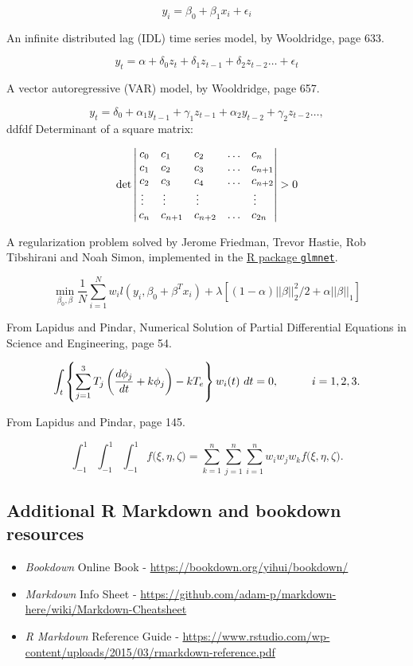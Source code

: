 \documentclass[12pt,oneside]{chicagocapstone}
\begin{document}
\[y_i = \beta_0 + \beta_1 x_i + \epsilon_i\]

An infinite distributed lag (IDL) time series model, by Wooldridge, page
633.

\[ y_t = \alpha + \delta_0 z_t + \delta_1 z_{t-1} + \delta_2 z_{t-2} \ldots + \epsilon_t\]

A vector autoregressive (VAR) model, by Wooldridge, page 657.

\[ y_t = \delta_0 + \alpha_1 y_{t-1} + \gamma_1 z_{t-1} + \alpha_2 y_{t-2} + \gamma_2 z_{t-2} \ldots,\]
\newpage
ddfdf Determinant of a square matrix:

\[\det\left|\,\begin{matrix}%
c_0&c_1\hfill&c_2\hfill&\ldots&c_n\hfill\cr
c_1&c_2\hfill&c_3\hfill&\ldots&c_{n+1}\hfill\cr
c_2&c_3\hfill&c_4\hfill&\ldots&c_{n+2}\hfill\cr
\,\vdots\hfill&\,\vdots\hfill&
  \,\vdots\hfill&&\,\vdots\hfill\cr
c_n&c_{n+1}\hfill&c_{n+2}\hfill&\ldots&c_{2n}\hfill\cr
\end{matrix}\right|>0\]
\bigskip

A regularization problem solved by Jerome Friedman, Trevor Hastie, Rob
Tibshirani and Noah Simon, implemented in the
\href{https://cran.r-project.org/web/packages/glmnet/index.html}{R
package \texttt{glmnet}}.

\[ \min_{\beta_0,\beta} \frac{1}{N}\sum_{i=1}^N w_il(y_i,\beta_0+\beta^Tx_i)+\lambda \left[(1-\alpha) ||\beta||_2^2/2+\alpha||\beta||_1\right]\]

\bigskip

From Lapidus and Pindar, Numerical Solution of Partial Differential
Equations in Science and Engineering, page 54.

\[\int_t\left\{\sum_{j=1}^3 T_j \left({d\phi_j\over dt}+k\phi_j\right)-kT_e\right\}w_i(t)\ dt=0, \qquad\quad i=1,2,3.\]

\bigskip

From Lapidus and Pindar, page 145.

\[\int_{-1}^1\!\int_{-1}^1\!\int_{-1}^1 f\big(\xi,\eta,\zeta\big) = \sum_{k=1}^n\sum_{j=1}^n\sum_{i=1}^n w_i w_j w_k f\big( \xi,\eta,\zeta\big).\]

\subsection*{Additional R Markdown and bookdown
resources}\label{additional-r-markdown-and-bookdown-resources}
\begin{itemize}
\item
  \emph{Bookdown} Online Book -
  \url{https://bookdown.org/yihui/bookdown/}
\item
  \emph{Markdown} Info Sheet -
  \url{https://github.com/adam-p/markdown-here/wiki/Markdown-Cheatsheet}
\item
  \emph{R Markdown} Reference Guide -
  \url{https://www.rstudio.com/wp-content/uploads/2015/03/rmarkdown-reference.pdf}
\end{itemize}
\end{document}
